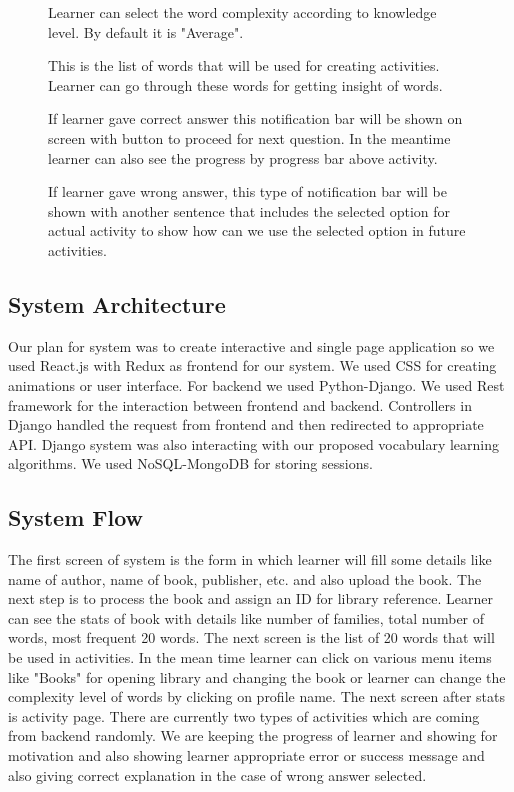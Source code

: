 \documentclass[11pt,a4paper]{article}
\begin{document}
\begin{figure}
\begin{tcbraster}[raster columns=1, enhanced, blankest]
\caption{Learner can select the word complexity according to knowledge level. By default it is "Average".}


\caption{This is the list of words that will be used for creating activities. Learner can go through these words for getting insight of words.}

\caption{If learner gave correct answer this notification bar will be shown on screen with button to proceed for next question. In the meantime learner can also see the progress by progress bar above activity.}

\caption{If learner gave wrong answer, this type of notification bar will be shown with another sentence that includes the selected option for actual activity to show how can we use the selected option in future activities.}
\end{tcbraster}
\end{figure}




\subsection{System Architecture}
Our plan for system was to create interactive and single page application so we used React.js with Redux as frontend for our system. We used CSS for creating animations or user interface. For backend we used Python-Django. We used Rest framework for the interaction between frontend and backend. Controllers in Django handled the request from frontend and then redirected to appropriate API. Django system was also interacting with our proposed vocabulary learning algorithms. We used NoSQL-MongoDB for storing sessions.   



\subsection{System Flow}
The first screen of system is the form in which learner will fill some details like name of author, name of book, publisher, etc. and also upload the book. The next step is to process the book and assign an ID for library reference. Learner can see the stats of book with details like number of families, total number of words, most frequent 20 words. 
The next screen is the list of 20 words that will be used in activities. In the mean time learner can click on various menu items like "Books" for opening library and changing the book or learner can change the complexity level of words by clicking on profile name. The next screen after stats is activity page. There are currently two types of activities which are coming from backend randomly. We are keeping the progress of learner and showing for motivation and also showing learner appropriate error or success message and also giving correct explanation in the case of wrong answer selected. 
\end{document}
